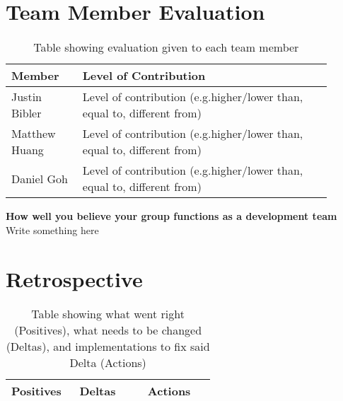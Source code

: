 \documentclass[10pt,journal,compsoc,draftclsnofoot]{IEEEtran}
\begin{document}
\begin{flushleft}
\section{Team Member Evaluation}

\begin{center}
\begin{table}[H]
\caption{Table showing evaluation given to each team member}
\begin{tabular}{ | p{0.2\linewidth} | p{0.7\linewidth} | }
\hline
\textbf{Member}  & \textbf{Level of Contribution} \\ \hline

Justin Bibler &
Level of contribution (e.g.higher/lower than, equal to, different from) \\ \hline

Matthew Huang &
Level of contribution (e.g.higher/lower than, equal to, different from) \\ \hline

Daniel Goh &
Level of contribution (e.g.higher/lower than, equal to, different from) \\ \hline

\end{tabular}
\newline
\label{table:retro}
\end{table}
\end{center}

\textbf{How well you believe your group functions as a development team} \\
Write something here

\newpage

\section{Retrospective}

\begin{center}
\begin{table}[H]
\caption{Table showing what went right (Positives), what needs to be changed (Deltas), and implementations to fix said Delta (Actions)}
\begin{tabular}{ | p{0.3\linewidth} | p{0.3\linewidth} | p{0.3\linewidth} | }
\hline
\textbf{Positives}  & \textbf{Deltas}  & \textbf{Actions} \\ \hline


\end{tabular}
\end{table}
\end{center}
\end{flushleft}
\end{document}
